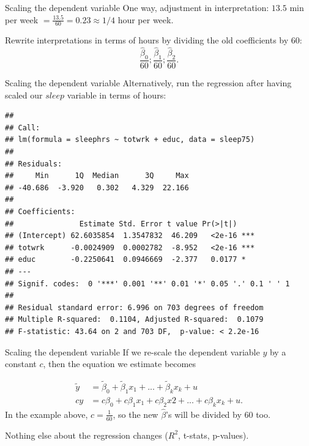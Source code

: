 \documentclass[
  ignorenonframetext,
]{beamer}
\newenvironment{Shaded}{\begin{snugshade}}{\end{snugshade}}
\newcommand{\DecValTok}[1]{\textcolor[rgb]{0.00,0.00,0.81}{#1}}
\newcommand{\FunctionTok}[1]{\textcolor[rgb]{0.00,0.00,0.00}{#1}}
\newcommand{\NormalTok}[1]{#1}
\newcommand{\OtherTok}[1]{\textcolor[rgb]{0.56,0.35,0.01}{#1}}
\newcommand{\SpecialCharTok}[1]{\textcolor[rgb]{0.00,0.00,0.00}{#1}}
\begin{document}
\begin{frame}{Scaling the dependent variable}
\protect\hypertarget{scaling-the-dependent-variable}{}
One way, adjustment in interpretation: \(13.5\) min per week
\(=\frac{13.5}{60}=0.23\approx 1/4\) hour per week.

Rewrite interpretations in terms of hours by dividing the old
coefficients by 60: \[
\frac{\hat{\beta}_0}{60};\frac{\hat{\beta}_1}{60};\frac{\hat{\beta}_2}{60}. 
\]
\end{frame}

\begin{frame}[fragile]{Scaling the dependent variable}
\protect\hypertarget{scaling-the-dependent-variable-1}{}
Alternatively, run the regression after having scaled our \(sleep\)
variable in terms of hours: \tiny

\begin{Shaded}
\end{Shaded}

\begin{verbatim}
## 
## Call:
## lm(formula = sleephrs ~ totwrk + educ, data = sleep75)
## 
## Residuals:
##     Min      1Q  Median      3Q     Max 
## -40.686  -3.920   0.302   4.329  22.166 
## 
## Coefficients:
##               Estimate Std. Error t value Pr(>|t|)    
## (Intercept) 62.6035854  1.3547832  46.209   <2e-16 ***
## totwrk      -0.0024909  0.0002782  -8.952   <2e-16 ***
## educ        -0.2250641  0.0946669  -2.377   0.0177 *  
## ---
## Signif. codes:  0 '***' 0.001 '**' 0.01 '*' 0.05 '.' 0.1 ' ' 1
## 
## Residual standard error: 6.996 on 703 degrees of freedom
## Multiple R-squared:  0.1104, Adjusted R-squared:  0.1079 
## F-statistic: 43.64 on 2 and 703 DF,  p-value: < 2.2e-16
\end{verbatim}
\end{frame}

\begin{frame}{Scaling the dependent variable}
\protect\hypertarget{scaling-the-dependent-variable-2}{}
If we re-scale the dependent variable \(y\) by a constant \(c\), then
the equation we estimate becomes

\[
\begin{aligned}
\tilde{y}&=\tilde{\beta}_0+\tilde{\beta}_1x_1+...+\tilde{\beta}_kx_k+u\\
cy&=c\beta_0+c\beta_1x_1+c\beta_2x2+...+c\beta_kx_k+u.
\end{aligned}
\] In the example above, \(c=\frac{1}{60}\), so the new
\(\hat{\beta}\)'s will be divided by 60 too.

Nothing else about the regression changes (\(R^2\), t-stats, p-values).
\end{frame}
\end{document}
